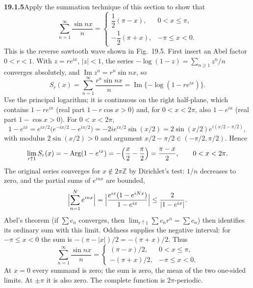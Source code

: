 \par\bigskip
\noindent\textbf{19.1.5}\quad Apply the summation technique of this
section to show that
\[
\sum_{n=1}^{\infty}\frac{\sin nx}{n}
=\begin{cases}
\dfrac{1}{2}(\pi-x), & 0<x\le\pi,\\[10pt]
-\dfrac{1}{2}(\pi+x), & -\pi\le x<0.
\end{cases}
\]
This is the reverse sawtooth wave shown in Fig.~19.5.
\solution
First insert an Abel factor $0<r<1$. With $z=re^{ix}$, $|z|<1$, the
series $-\log(1-z)=\sum_{n\ge1}z^n/n$ converges absolutely, and
$\operatorname{Im}z^n=r^n\sin nx$, so
\[
S_r(x)=\sum_{n=1}^{\infty}\frac{r^n\sin nx}{n}
=\operatorname{Im}\{-\log(1-re^{ix})\}.
\]
Use the principal logarithm; it is continuous on the right half-plane,
which contains $1-re^{ix}$ (real part $1-r\cos x>0$) and, for
$0<x<2\pi$, also $1-e^{ix}$ (real part $1-\cos x>0$). For $0<x<2\pi$,
\[
1-e^{ix}=e^{ix/2}\bigl(e^{-ix/2}-e^{ix/2}\bigr)
=-2i e^{ix/2}\sin(x/2)
=2\sin(x/2)e^{i(x/2-\pi/2)},
\]
with modulus $2\sin(x/2)>0$ and argument
$x/2-\pi/2\in(-\pi/2,\pi/2)$. Hence
\[
\lim_{r\uparrow1}S_r(x)=-\operatorname{Arg}(1-e^{ix})
=-\Bigl(\frac x2-\frac\pi2\Bigr)=\frac{\pi-x}2,\qquad0<x<2\pi.
\]
The original series converges for $x\notin2\pi\mathbb Z$ by Dirichlet's
test: $1/n$ decreases to zero, and the partial sums of $e^{inx}$ are
bounded,
\[
\Bigl|\sum_{n=1}^Ne^{inx}\Bigr|
=\Bigl|\frac{e^{ix}(1-e^{iNx})}{1-e^{ix}}\Bigr|\le\frac2{|1-e^{ix}|}.
\]
Abel's theorem (if $\sum c_n$ converges, then
$\lim_{r\uparrow1}\sum c_nr^n=\sum c_n$) then identifies its ordinary sum
with this limit. Oddness supplies the negative interval: for
$-\pi\le x<0$ the sum is $-(\pi-|x|)/2=-(\pi+x)/2$. Thus
\[
\boxed{\sum_{n=1}^{\infty}\frac{\sin nx}{n}
=\begin{cases}(\pi-x)/2,&0<x\le\pi,\\
-(\pi+x)/2,&-\pi\le x<0.\end{cases}}
\]
At $x=0$ every summand is zero; the sum is zero, the mean of the two
one-sided limits. At $\pm\pi$ it is also zero. The complete function is
$2\pi$-periodic.

